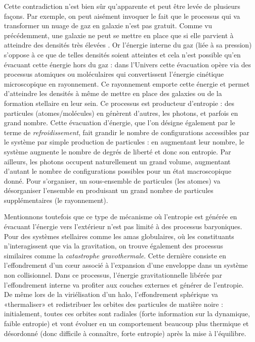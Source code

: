 Cette contradiction n'est bien sûr qu'apparente et peut être levée de plusieurs façons. Par exemple, on peut aisément invoquer le fait que le processus qui va transformer un nuage de gaz en galaxie n'est pas gratuit. Comme vu précédemment, une galaxie ne peut se mettre en place que si elle parvient à atteindre des densités très élevées . Or l'énergie interne du gaz (liée à sa pression) s'oppose à ce que de telles densités soient atteintes et cela n'est possible qu'en évacuant cette énergie hors du gaz : dans l'Univers cette évacuation opère via des processus atomiques ou moléculaires qui convertissent l'énergie cinétique microscopique en rayonnement. Ce rayonnement emporte cette énergie et permet d'atteindre les densités à même de mettre en place des galaxies ou de la formation stellaire en leur sein. Ce processus est producteur d'entropie : des particules (atomes/molécules) en génèrent d'autres, les photons, et parfois en grand nombre. Cette évacuation d'énergie, que l'on désigne également par le terme de \textit{refroidissement}, fait grandir le nombre de configurations accessibles par le système par simple production de particules : en augmentant leur nombre, le système augmente le nombre de degrés de liberté et donc son entropie. Par ailleurs, les photons occupent naturellement un grand volume, augmentant d'autant le nombre de configurations possibles pour un état macroscopique donné.  Pour s'organiser, un sous-ensemble de particules (les atomes) va désorganiser l'ensemble en produisant un grand nombre de particules supplémentaires (le rayonnement).

Mentionnons toutefois que ce type de mécanisme où l'entropie est générée en évacuant l'énergie vers l'extérieur n'est pas limité à des processus baryoniques. Pour des systèmes stellaires comme les amas globulaires, où les constituants n'interagissent que via la gravitation, on trouve également des processus similaires comme la \textit{catastrophe gravothermale}. Cette dernière consiste en l'effondrement d'un cœur associé à l'expansion d'une enveloppe dans un système non collisionnel. Dans ce processus, l'énergie gravitationnelle libérée par l'effondrement interne va profiter aux couches externes et générer de l'entropie. De même lors de la viriélisation d'un halo, l'effondrement sphérique va «thermaliser» et redistribuer les orbites des particules de matière noire : initialement, toutes ces orbites sont radiales (forte information sur la dynamique, faible entropie) et vont évoluer en un comportement beaucoup plus thermique et désordonné (donc difficile à connaître, forte entropie) après la mise à l'équilibre.

